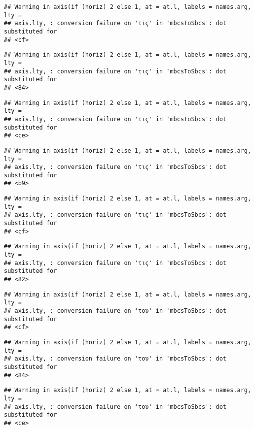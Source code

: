 \documentclass[
]{article}
\begin{document}
\begin{verbatim}
## Warning in axis(if (horiz) 2 else 1, at = at.l, labels = names.arg, lty =
## axis.lty, : conversion failure on 'τις' in 'mbcsToSbcs': dot substituted for
## <cf>
\end{verbatim}

\begin{verbatim}
## Warning in axis(if (horiz) 2 else 1, at = at.l, labels = names.arg, lty =
## axis.lty, : conversion failure on 'τις' in 'mbcsToSbcs': dot substituted for
## <84>
\end{verbatim}

\begin{verbatim}
## Warning in axis(if (horiz) 2 else 1, at = at.l, labels = names.arg, lty =
## axis.lty, : conversion failure on 'τις' in 'mbcsToSbcs': dot substituted for
## <ce>
\end{verbatim}

\begin{verbatim}
## Warning in axis(if (horiz) 2 else 1, at = at.l, labels = names.arg, lty =
## axis.lty, : conversion failure on 'τις' in 'mbcsToSbcs': dot substituted for
## <b9>
\end{verbatim}

\begin{verbatim}
## Warning in axis(if (horiz) 2 else 1, at = at.l, labels = names.arg, lty =
## axis.lty, : conversion failure on 'τις' in 'mbcsToSbcs': dot substituted for
## <cf>
\end{verbatim}

\begin{verbatim}
## Warning in axis(if (horiz) 2 else 1, at = at.l, labels = names.arg, lty =
## axis.lty, : conversion failure on 'τις' in 'mbcsToSbcs': dot substituted for
## <82>
\end{verbatim}

\begin{verbatim}
## Warning in axis(if (horiz) 2 else 1, at = at.l, labels = names.arg, lty =
## axis.lty, : conversion failure on 'του' in 'mbcsToSbcs': dot substituted for
## <cf>
\end{verbatim}

\begin{verbatim}
## Warning in axis(if (horiz) 2 else 1, at = at.l, labels = names.arg, lty =
## axis.lty, : conversion failure on 'του' in 'mbcsToSbcs': dot substituted for
## <84>
\end{verbatim}

\begin{verbatim}
## Warning in axis(if (horiz) 2 else 1, at = at.l, labels = names.arg, lty =
## axis.lty, : conversion failure on 'του' in 'mbcsToSbcs': dot substituted for
## <ce>
\end{verbatim}
\end{document}
